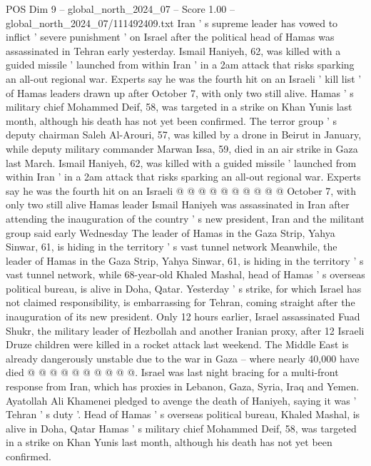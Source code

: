 \begin{textsample}{POS Dim 9 – global\_north\_2024\_07 – Score 1.00 – global\_north\_2024\_07/111492409.txt}  \label{ex:f9_pos_317}
Iran ' s supreme leader has vowed to inflict ' severe punishment ' on Israel after the political head of Hamas was assassinated in Tehran early yesterday.
Ismail Haniyeh, 62, was killed with a guided missile ' launched from within Iran ' in a 2am attack that risks sparking an all-out regional war.
Experts say he was the fourth hit on an Israeli ' kill list ' of Hamas leaders drawn up after October 7, with only two still alive.
Hamas ' s military chief Mohammed Deif, 58, was targeted in a strike on Khan Yunis last month, although his death has not yet been confirmed.
The terror group ' s deputy chairman Saleh Al-Arouri, 57, was killed by a drone in Beirut in January, while deputy military commander Marwan Issa, 59, died in an air strike in Gaza last March.
Ismail Haniyeh, 62, was killed with a guided missile ' launched from within Iran ' in a 2am attack that risks sparking an all-out regional war.
Experts say he was the fourth hit on an Israeli @ @ @ @ @ @ @ @ @ @ October 7, with only two still alive Hamas leader Ismail Haniyeh was assassinated in Iran after attending the inauguration of the country ' s new president, Iran and the militant group said early Wednesday The leader of Hamas in the Gaza Strip, Yahya Sinwar, 61, is hiding in the territory ' s vast tunnel network Meanwhile, the leader of Hamas in the Gaza Strip, Yahya Sinwar, 61, is hiding in the territory ' s vast tunnel network, while 68-year-old Khaled Mashal, head of Hamas ' s overseas political bureau, is alive in Doha, Qatar.
Yesterday ' s strike, for which Israel has not claimed responsibility, is embarrassing for Tehran, coming straight after the inauguration of its new president.
Only 12 hours earlier, Israel assassinated Fuad Shukr, the military leader of Hezbollah and another Iranian proxy, after 12 Israeli Druze children were killed in a rocket attack last weekend.
The Middle East is already dangerously unstable due to the war in Gaza -- where nearly 40,000 have died @ @ @ @ @ @ @ @ @ @.
Israel was last night bracing for a multi-front response from Iran, which has proxies in Lebanon, Gaza, Syria, Iraq and Yemen.
Ayatollah Ali Khamenei pledged to avenge the death of Haniyeh, saying it was ' Tehran ' s duty '.
Head of Hamas ' s overseas political bureau, Khaled Mashal, is alive in Doha, Qatar Hamas ' s military chief Mohammed Deif, 58, was targeted in a strike on Khan Yunis last month, although his death has not yet been confirmed.

\end{textsample}
